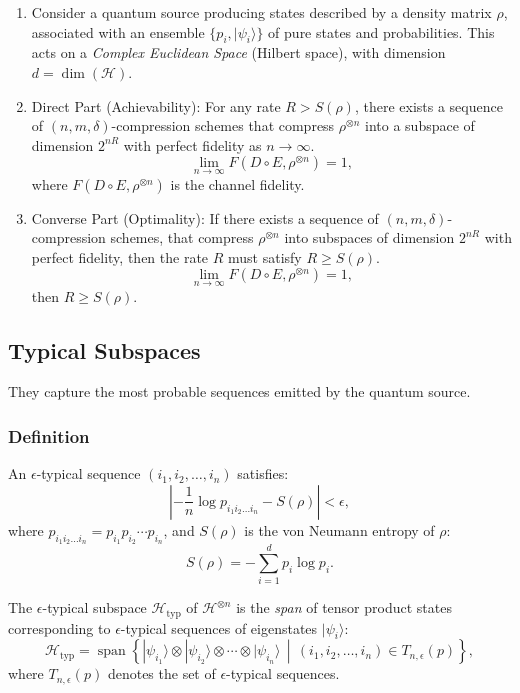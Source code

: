 \begin{enumerate}

\item Consider a quantum source producing states described by a density matrix \(\rho\), associated with an ensemble \(\{p_i, |\psi_i\rangle\}\) of pure states and probabilities. This acts on a \textit{Complex Euclidean Space} (Hilbert space), with dimension \(d = \dim(\mathcal{H})\). 

\item Direct Part (Achievability): For any rate \(R > S(\rho)\), there exists a sequence of \((n, m, \delta)\)-compression schemes that compress \(\rho^{\otimes n}\) into a subspace of dimension \(2^{nR}\) with perfect fidelity as \(n \to \infty\).
\[
\lim_{n \to \infty} F(D \circ E, \rho^{\otimes n}) = 1,
\]
where \(F(D \circ E, \rho^{\otimes n})\) is the channel fidelity.

\item Converse Part (Optimality): If there exists a sequence of \((n, m, \delta)\)-compression schemes, that compress \(\rho^{\otimes n}\) into subspaces of dimension \(2^{nR}\) with perfect fidelity, then the rate \(R\) must satisfy \(R \geq S(\rho)\).
\[
\lim_{n \to \infty} F(D \circ E, \rho^{\otimes n}) = 1,
\]
then \(R \geq S(\rho)\).

\end{enumerate}

\subsection{Typical Subspaces}
They capture the most probable sequences emitted by the quantum source.

\subsubsection{Definition}

An \(\epsilon\)-typical sequence \((i_1, i_2, \dots, i_n)\) satisfies:
\[
\left| -\frac{1}{n} \log p_{i_1 i_2 \dots i_n} - S(\rho) \right| < \epsilon,
\]
where \(p_{i_1 i_2 \dots i_n} = p_{i_1} p_{i_2} \cdots p_{i_n}\), and \(S(\rho)\) is the von Neumann entropy of \(\rho\):
\[
S(\rho) = - \sum_{i=1}^d p_i \log p_i.
\]

The \(\epsilon\)-typical subspace \(\mathcal{H}_{\text{typ}}\) of \(\mathcal{H}^{\otimes n}\) is the \textit{span} of tensor product states corresponding to \(\epsilon\)-typical sequences of eigenstates \(|\psi_i\rangle\):
\[
\mathcal{H}_{\text{typ}} = \operatorname{span}\left\{ |\psi_{i_1}\rangle \otimes |\psi_{i_2}\rangle \otimes \cdots \otimes |\psi_{i_n}\rangle \, \middle| \, (i_1, i_2, \dots, i_n) \in T_{n, \epsilon}(p) \right\},
\]
where \(T_{n, \epsilon}(p)\) denotes the set of \(\epsilon\)-typical sequences.

